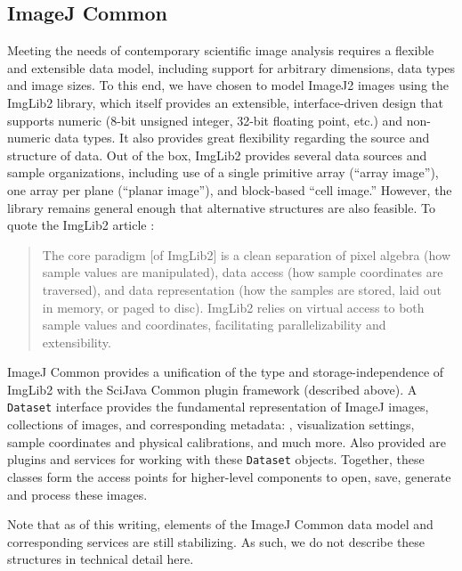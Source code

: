 \documentclass{bmcart}
\begin{document}
\subsection*{ImageJ Common}

Meeting the needs of contemporary scientific image analysis requires a flexible
and extensible data model, including support for arbitrary dimensions, data
types and image sizes. To this end, we have chosen to model ImageJ2 images
using the ImgLib2 library, which itself provides an extensible,
interface-driven design that supports numeric (8-bit unsigned integer, 32-bit
floating point, etc.) and non-numeric data types. It also provides great
flexibility regarding the source and structure of data. Out of the box, ImgLib2
provides several data sources and sample organizations, including use of a
single primitive array (``array image''), one array per plane (``planar
image''), and block-based ``cell image.'' However, the library remains general
enough that alternative structures are also feasible. To quote the ImgLib2
article \cite{imglib2}:

\begin{quote}
  The core paradigm [of ImgLib2] is a clean separation of pixel algebra (how
  sample values are manipulated), data access (how sample coordinates are
  traversed), and data representation (how the samples are stored, laid out in
  memory, or paged to disc). ImgLib2 relies on virtual access to both sample
  values and coordinates, facilitating parallelizability and extensibility.
\end{quote}

ImageJ Common provides a unification of the type and storage-independence of
ImgLib2 with the SciJava Common plugin framework (described above). A
\texttt{Dataset} interface provides the fundamental representation of ImageJ
images, collections of images, and corresponding metadata: ,
visualization settings, sample coordinates and physical calibrations, and much
more. Also provided are plugins and services for working with these
\texttt{Dataset} objects. Together, these classes form the access points for
higher-level components to open, save, generate and process these images.

Note that as of this writing, elements of the ImageJ Common data model and
corresponding services are still stabilizing. As such, we do not describe these
structures in technical detail here.
\end{document}
